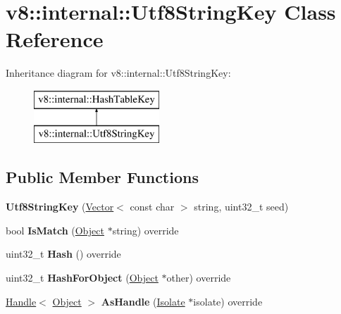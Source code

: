 \hypertarget{classv8_1_1internal_1_1_utf8_string_key}{}\section{v8\+:\+:internal\+:\+:Utf8\+String\+Key Class Reference}
\label{classv8_1_1internal_1_1_utf8_string_key}
Inheritance diagram for v8\+:\+:internal\+:\+:Utf8\+String\+Key\+:\begin{figure}[H]
\begin{center}
\leavevmode
\includegraphics[height=2.000000cm]{classv8_1_1internal_1_1_utf8_string_key}
\end{center}
\end{figure}
\subsection*{Public Member Functions}
\begin{DoxyCompactItemize}
\item 
{\bfseries Utf8\+String\+Key} (\hyperlink{classv8_1_1internal_1_1_vector}{Vector}$<$ const char $>$ string, uint32\+\_\+t seed)\hypertarget{classv8_1_1internal_1_1_utf8_string_key_a68ab9f0d0de34dc7634c3f7c41ec9e48}{}\label{classv8_1_1internal_1_1_utf8_string_key_a68ab9f0d0de34dc7634c3f7c41ec9e48}

\item 
bool {\bfseries Is\+Match} (\hyperlink{classv8_1_1internal_1_1_object}{Object} $\ast$string) override\hypertarget{classv8_1_1internal_1_1_utf8_string_key_a70c6c3c01f05a9f4ce76d3b73d964365}{}\label{classv8_1_1internal_1_1_utf8_string_key_a70c6c3c01f05a9f4ce76d3b73d964365}

\item 
uint32\+\_\+t {\bfseries Hash} () override\hypertarget{classv8_1_1internal_1_1_utf8_string_key_a4832db161ee8567b204e63386b3cd8a8}{}\label{classv8_1_1internal_1_1_utf8_string_key_a4832db161ee8567b204e63386b3cd8a8}

\item 
uint32\+\_\+t {\bfseries Hash\+For\+Object} (\hyperlink{classv8_1_1internal_1_1_object}{Object} $\ast$other) override\hypertarget{classv8_1_1internal_1_1_utf8_string_key_ac488b8260e9d865e30d7dd528f4183e8}{}\label{classv8_1_1internal_1_1_utf8_string_key_ac488b8260e9d865e30d7dd528f4183e8}

\item 
\hyperlink{classv8_1_1internal_1_1_handle}{Handle}$<$ \hyperlink{classv8_1_1internal_1_1_object}{Object} $>$ {\bfseries As\+Handle} (\hyperlink{classv8_1_1internal_1_1_isolate}{Isolate} $\ast$isolate) override\hypertarget{classv8_1_1internal_1_1_utf8_string_key_a7aeee988576f7baaa9f21e48ee8ce10e}{}\label{classv8_1_1internal_1_1_utf8_string_key_a7aeee988576f7baaa9f21e48ee8ce10e}

\end{DoxyCompactItemize}

